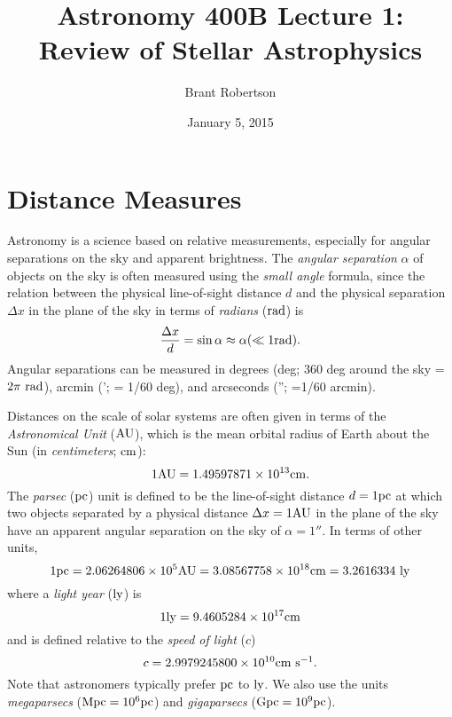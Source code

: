 \documentclass[12pt]{article}
\title{Astronomy 400B Lecture 1: Review of Stellar Astrophysics}
\author{Brant Robertson}
\date{January 5, 2015}
\begin{document}
\maketitle

\section{Distance Measures}

Astronomy is a science based on relative measurements, 
especially for angular separations on the sky and apparent brightness.
The {\it angular separation} $\alpha$ of objects on the sky
is often measured
using the {\it small angle} formula, since the relation between
the physical line-of-sight distance $d$ and the physical separation 
$\Delta x$ in the plane of the sky in terms of {\it radians} ($\mathrm{rad}$) is
\begin{equation}
\label{eqn:small_angle}
\frac{\Delta x}{d} = \sin \alpha \approx \alpha (\ll 1 \mathrm{rad}).
\end{equation}
Angular separations can be measured in degrees (deg; 360 deg around the sky = $2\pi~\mathrm{rad}$), 
arcmin ('; = 1/60 deg),
and arcseconds (''; =1/60 arcmin).

Distances on the scale of solar systems are often given in terms
of the {\it Astronomical Unit} ($\mathrm{AU}$), which is the mean orbital
radius of Earth about the Sun (in {\it centimeters}; $\mathrm{cm}$):
\begin{equation}
\label{eqn:AU}
1 \mathrm{AU} = 1.49597871 \times 10^{13} \mathrm{cm}.
\end{equation}
\noindent
The {\it parsec} ($\mathrm{pc}$) unit is defined to be the line-of-sight distance $d=1 \mathrm{pc}$
at which two objects separated by a physical distance $\Delta x=1\mathrm{AU}$ in the
plane of the sky have an apparent angular separation on the sky of $\alpha=1''$.
In terms of other units,
\begin{equation}
\label{eqn:parsec}
1\mathrm{pc} = 2.06264806 \times 10^{5} \mathrm{AU} = 3.08567758 \times 10^{18} \mathrm{cm} = 3.2616334~\mathrm{ly}
\end{equation}
\noindent
where a {\it light year} ($\mathrm{ly}$) is
\begin{equation}
1\mathrm{ly} = 9.4605284\times10^{17}\mathrm{cm}
\end{equation}
\noindent
and is defined relative to the {\it speed of light} ($c$)
\begin{equation}
\label{eqn:speed_of_light}
c = 2.9979245800\times10^{10} \mathrm{cm}~\mathrm{s}^{-1}.
\end{equation}
\noindent
Note that astronomers typically prefer $\mathrm{pc}$ to $\mathrm{ly}$. We also
use the units {\it megaparsecs} ($\mathrm{Mpc} = 10^6 \mathrm{pc}$) and {\it gigaparsecs}
($\mathrm{Gpc} = 10^9 \mathrm{pc}$).
\end{document}
